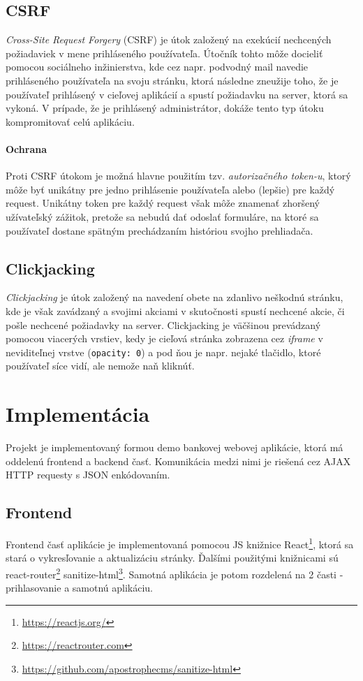 \documentclass[12pt,a4paper]{article}
\begin{document}
	\subsection{CSRF}
		\textit{Cross-Site Request Forgery} (CSRF) je útok založený na exekúcií nechcených požiadaviek v mene prihláseného používateľa. Útočník tohto môže docieliť pomocou sociálneho inžinierstva, kde cez napr. podvodný mail navedie prihláseného používateľa na svoju stránku, ktorá následne zneužije toho, že je používateľ prihlásený v cieľovej aplikácií a spustí požiadavku na server, ktorá sa vykoná. V prípade, že je prihlásený administrátor, dokáže tento typ útoku kompromitovať celú aplikáciu.
		
		\paragraph{Ochrana} Proti CSRF útokom je možná hlavne použitím tzv. \textit{autorizačného token-u}, ktorý môže byť unikátny pre jedno prihlásenie používateľa alebo (lepšie) pre každý request. Unikátny token pre každý request však môže znamenať zhoršený užívateľský zážitok, pretože sa nebudú dať odoslať formuláre, na ktoré sa používateľ dostane spätným prechádzaním históriou svojho prehliadača.
		
	\subsection{Clickjacking}
		\textit{Clickjacking} je útok založený na navedení obete na zdanlivo neškodnú stránku, kde je však zavádzaný a svojimi akciami v skutočnosti spustí nechcené akcie, či pošle nechcené požiadavky na server. Clickjacking je väčšinou prevádzaný pomocou viacerých vrstiev, kedy je cieľová stránka zobrazena cez \textit{iframe} v neviditeľnej vrstve (\texttt{opacity: 0}) a pod ňou je napr. nejaké tlačidlo, ktoré používateľ síce vidí, ale nemože naň kliknúť.
		
	
\section{Implementácia}
	Projekt je implementovaný formou demo bankovej webovej aplikácie, ktorá má oddelenú frontend a backend časť. Komunikácia medzi nimi je riešená cez AJAX HTTP requesty s JSON enkódovaním.
	
	\subsection{Frontend}
		Frontend časť aplikácie je implementovaná pomocou JS knižnice React\footnote{\url{https://reactjs.org/}}, ktorá sa stará o vykresľovanie a aktualizáciu stránky. Ďalšími použitými knižnicami sú react-router\footnote{\url{https://reactrouter.com}} sanitize-html\footnote{\url{https://github.com/apostrophecms/sanitize-html}}. Samotná aplikácia je potom rozdelená na 2 časti - prihlasovanie a samotnú aplikáciu.
		
\end{document}
